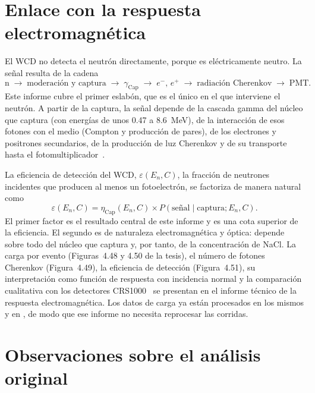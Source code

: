 \documentclass[11pt,a4paper]{article}
\newcommand{\archivo}[1]{\path{#1}}
\begin{document}
\section{Enlace con la respuesta electromagnética}
\label{sec:enlace}

El WCD no detecta el neutrón directamente, porque es eléctricamente neutro. La señal resulta de la cadena
\[
\mathrm{n}\;\longrightarrow\;\text{moderación y captura}\;\longrightarrow\;\gamma_\mathrm{Cap}\;\longrightarrow\;e^-,\,e^+\;\longrightarrow\;\text{radiación Cherenkov}\;\longrightarrow\;\mathrm{PMT}.
\]
Este informe cubre el primer eslabón, que es el único en el que interviene el neutrón. A partir de la captura, la señal depende de la cascada gamma del núcleo que captura (con energías de unos 0.47 a 8.6~MeV), de la interacción de esos fotones con el medio (Compton y producción de pares), de los electrones y positrones secundarios, de la producción de luz Cherenkov y de su transporte hasta el fotomultiplicador~\cite{Knoll2010}.

La eficiencia de detección del WCD, $\varepsilon(E_n,C)$, la fracción de neutrones incidentes que producen al menos un fotoelectrón, se factoriza de manera natural como
\begin{equation}
\varepsilon(E_n,C)=\eta_\mathrm{Cap}(E_n,C)\times P(\text{señal}\mid\text{captura};E_n,C).
\end{equation}
El primer factor es el resultado central de este informe y es una cota superior de la eficiencia. El segundo es de naturaleza electromagnética y óptica: depende sobre todo del núcleo que captura y, por tanto, de la concentración de NaCl. La carga por evento (Figuras~4.48 y 4.50 de la tesis), el número de fotones Cherenkov (Figura~4.49), la eficiencia de detección (Figura~4.51), su interpretación como función de respuesta con incidencia normal y la comparación cualitativa con los detectores CRS1000~\cite{Kohli2018} se presentan en el informe técnico de la respuesta electromagnética. Los datos de carga ya están procesados en los mismos \archivo{resumen.json} y en \archivo{resumen_campana.tsv}, de modo que ese informe no necesita reprocesar las corridas.

\section{Observaciones sobre el análisis original}
\label{sec:observaciones}
\end{document}
